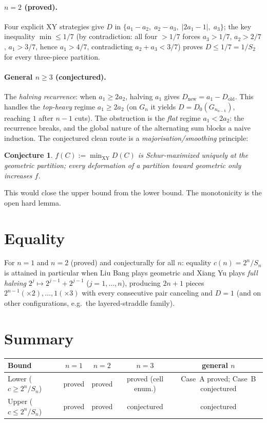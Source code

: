 \documentclass[11pt]{article}
\newtheorem{conjecture}{Conjecture}
\theoremstyle{remark}\newtheorem*{remark}{Remark}
\newcommand{\Sn}{S_{n}}
\newcommand{\Gn}{G_{n}}
\begin{document}
\paragraph{$n=2$ (proved).} Four explicit XY strategies give $D$ in
$\{a_1-a_2,\;a_2-a_3,\;|2a_1-1|,\;a_3\}$; the key inequality
$\min\le1/7$ (by contradiction: all four $>1/7$ forces $a_3>1/7$,
$a_2>2/7$, $a_1>3/7$, hence $a_1>4/7$, contradicting $a_2+a_3<3/7$)
proves $D\le1/7=1/S_2$ for every three-piece partition.

\paragraph{General $n\ge3$ (conjectured).} The \emph{halving recurrence}: when
$a_1\ge2a_2$, halving $a_1$ gives $D_{\text{new}}=a_1-D_{\text{old}}$. This handles
the \emph{top-heavy} regime $a_1\ge2a_2$ (on $\Gn$ it yields $D=D_0(\Gn_{n-k})$,
reaching $1$ after $n-1$ cuts). The obstruction is the \emph{flat} regime
$a_1<2a_2$: the recurrence breaks, and the global nature of the alternating sum
blocks a naive induction. The conjectured clean route is a
\emph{majorisation/smoothing} principle:
\begin{conjecture}
$f(C):=\min_{\text{XY}}D(C)$ is Schur-maximized uniquely at the geometric
partition; every deformation of a partition toward geometric only increases $f$.
\end{conjecture}
This would close the upper bound from the lower bound. The monotonicity is the
open hard lemma.

\section{Equality}

For $n=1$ and $n=2$ (proved) and conjecturally for all $n$: equality
$c(n)=2^n/\Sn$ is attained in particular when Liu Bang plays geometric and
Xiang Yu plays \emph{full halving}
$2^j\mapsto2^{j-1}+2^{j-1}$ ($j=1,\ldots,n$), producing $2n+1$ pieces
$2^{n-1}(\times2),\ldots,1(\times3)$ with every consecutive pair canceling and
$D=1$ (and on other configurations, e.g.\ the layered-straddle family).

\section*{Summary}

\begin{center}
\begin{tabular}{lcccc}
\toprule
Bound & $n=1$ & $n=2$ & $n=3$ & general $n$\\\midrule
Lower ($c\ge2^n/\Sn$) & proved & proved & proved (cell enum.) & Case~A proved; Case~B conjectured\\
Upper ($c\le2^n/\Sn$) & proved & proved & conjectured & conjectured\\\bottomrule
\end{tabular}
\end{center}
\end{document}

